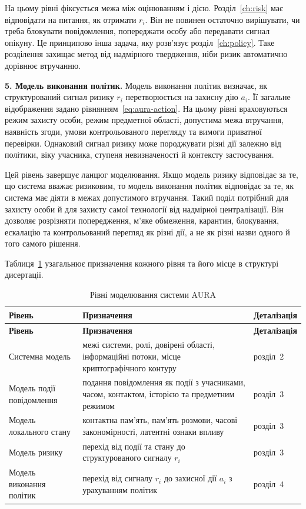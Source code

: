 На цьому рівні фіксується межа між оцінюванням і дією. Розділ~\ref{ch:risk} має відповідати на питання, як отримати \(r_i\). Він не повинен остаточно вирішувати, чи треба блокувати повідомлення, попереджати особу або передавати сигнал опікуну. Це принципово інша задача, яку розв'язує розділ~\ref{ch:policy}. Таке розділення захищає метод від надмірного твердження, ніби ризик автоматично дорівнює втручанню.

\textbf{5. Модель виконання політик.}
Модель виконання політик визначає, як структурований сигнал ризику \(r_i\) перетворюється на захисну дію \(a_i\). Її загальне відображення задано рівнянням~\eqref{eq:aura-action}. На цьому рівні враховуються режим захисту особи, режим предметної області, допустима межа втручання, наявність згоди, умови контрольованого перегляду та вимоги приватної перевірки. Однаковий сигнал ризику може породжувати різні дії залежно від політики, віку учасника, ступеня невизначеності й контексту застосування.

Цей рівень завершує ланцюг моделювання. Якщо модель ризику відповідає за те, що система вважає ризиковим, то модель виконання політик відповідає за те, як система має діяти в межах допустимого втручання. Такий поділ потрібний для захисту особи й для захисту самої технології від надмірної централізації. Він дозволяє розрізняти попередження, м'яке обмеження, карантин, блокування, ескалацію та контрольований перегляд як різні дії, а не як різні назви одного й того самого рішення.

Таблиця~\ref{tab:modeling-levels} узагальнює призначення кожного рівня та його місце в структурі дисертації.

\begin{longtable}{p{4.2cm} p{6.8cm} p{2.5cm}}
\caption{Рівні моделювання системи AURA}
\label{tab:modeling-levels}\\
\toprule
\textbf{Рівень} & \textbf{Призначення} & \textbf{Деталізація} \\
\midrule
\endfirsthead
\toprule
\textbf{Рівень} & \textbf{Призначення} & \textbf{Деталізація} \\
\midrule
\endhead
Системна модель & межі системи, ролі, довірені області, інформаційні потоки, місце криптографічного контуру & розділ~2 \\
Модель події повідомлення & подання повідомлення як події з учасниками, часом, контактом, історією та предметним режимом & розділ~3 \\
Модель локального стану & контактна пам'ять, пам'ять розмови, часові закономірності, латентні ознаки впливу & розділ~3 \\
Модель ризику & перехід від події та стану до структурованого сигналу \(r_i\) & розділ~3 \\
Модель виконання політик & перехід від сигналу \(r_i\) до захисної дії \(a_i\) з урахуванням політик & розділ~4 \\
\bottomrule
\end{longtable}

